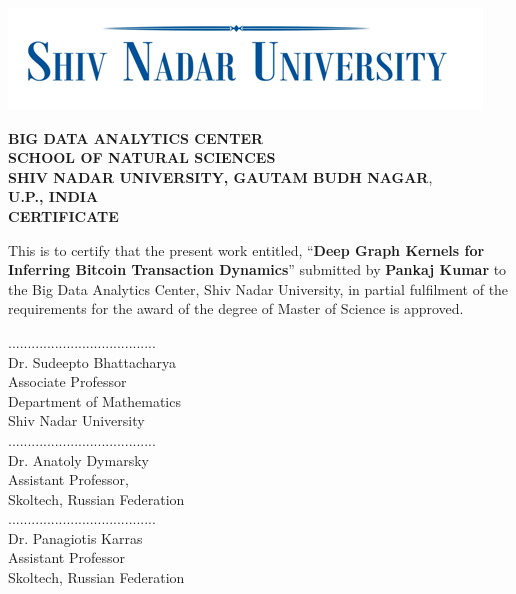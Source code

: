 \documentclass[12pt, oneside]{Thesis} %
\begin{document}
\pagestyle{fancy} %
\begin{center}
\begin{center}
\includegraphics[scale=0.8]{./snulogo.png}
\end{center}
\singlespacing
\singlespacing
\begin{center}
\textmd{\textbf{BIG DATA ANALYTICS CENTER}}\\
\singlespacing
\textbf{SCHOOL OF NATURAL SCIENCES}\\
\singlespacing
\textmd{\textbf{SHIV NADAR UNIVERSITY, GAUTAM BUDH NAGAR},}\\
\singlespacing
\textbf{U.P., INDIA}\\
\singlespacing
\singlespacing
\singlespacing
\singlespacing
\textbf{CERTIFICATE\\}
\end{center}
\end{center}
This is to certify that the present work entitled, ``\textbf{Deep Graph Kernels for Inferring Bitcoin Transaction Dynamics}” submitted by \textbf{Pankaj Kumar} to the Big Data Analytics Center, Shiv Nadar University, in partial fulfilment of the requirements for the award of the degree of Master of Science is approved.
\singlespacing
\singlespacing
\singlespacing
\singlespacing
\singlespacing
\singlespacing
\begin{minipage}{.45\linewidth}
\begin{flushleft}  
......................................\\                         
Dr. Sudeepto Bhattacharya \\
Associate Professor \\
Department of Mathematics\\
Shiv Nadar University \\
\vspace{12mm}
......................................\\ 
Dr. Anatoly Dymarsky \\
Assistant Professor, \\
Skoltech, Russian Federation \\
\vspace{12mm}
......................................\\ 
Dr. Panagiotis Karras \\
Assistant Professor \\
Skoltech, Russian Federation \\
\end{flushleft} 
\end{minipage}
\end{document}
